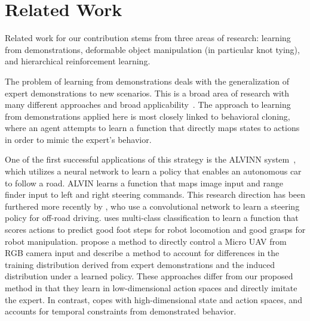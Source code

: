 \section{Related Work}



Related work for our contribution stems from three areas of research:
learning from demonstrations, deformable object manipulation (in particular
knot tying), and hierarchical reinforcement learning.

The problem of learning from demonstrations deals with the generalization of expert demonstrations to new scenarios. 
This is a broad area of research with many different approaches and broad applicability~\cite{Argall_2009, Schaal_1999}.
The approach to learning from demonstrations applied here is most closely linked to behavioral cloning, where an agent attempts to learn a function that directly maps states to actions in order to mimic the expert's behavior. 

One of the first successful applications of this strategy is the ALVINN system~\cite{Pomerleau_NIPS1989}, which utilizes a neural network to learn a policy that enables an autonomous car to follow a road.
ALVIN learns a function that maps image input and range finder input to left and right steering commands. 
This research direction has been furthered more recently by \citet{muller2005off}, who use a convolutional network to learn a steering policy for off-road driving.
\citet{Ratliff_Humanoids2007} uses multi-class classification to learn a function that scores actions to predict good foot steps for robot locomotion and good grasps for robot manipulation.
\citet{Ross_2013} propose a method to directly control a Micro UAV from RGB camera input and describe a method to account for differences in the training distribution derived from expert demonstrations and the induced distribution under a learned policy. 
These approaches differ from our proposed method in that they learn in low-dimensional action spaces and directly imitate the expert.
In contrast, \mmql{} copes with high-dimensional state and action spaces, and accounts for temporal constraints from demonstrated behavior.

